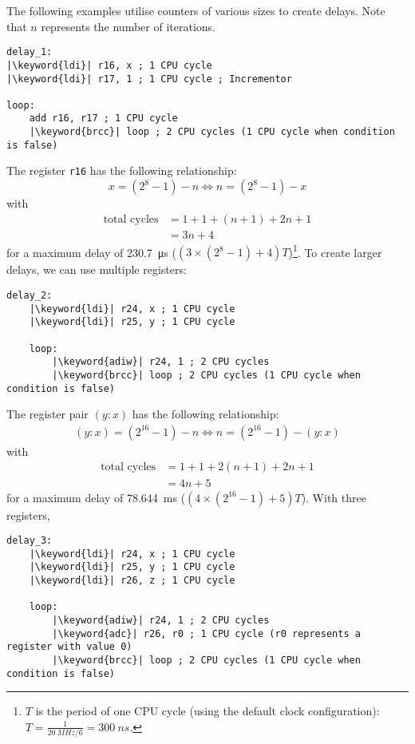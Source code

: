 \documentclass{report}
\newcommand{\keyword}[1]{\textcolor[rgb]{0.00,0.50,0.00}{\textbf{#1}}}
\begin{document}
The following examples utilise counters of various sizes to create
delays. Note that \(n\) represents the number of iterations.
\begin{verbatim}
delay_1:
|\keyword{ldi}| r16, x ; 1 CPU cycle
|\keyword{ldi}| r17, 1 ; 1 CPU cycle ; Incrementor

loop:
    add r16, r17 ; 1 CPU cycle
    |\keyword{brcc}| loop ; 2 CPU cycles (1 CPU cycle when condition is false)
\end{verbatim}
The register \texttt{r16} has the following relationship:
\begin{equation*}
    x = \left( 2^8 - 1 \right) - n \iff n = \left( 2^8 - 1 \right) - x
\end{equation*}
with
\begin{align*}
    \text{total cycles} & = 1 + 1 + \left( n + 1 \right) + 2 n + 1 \\
                        & = 3 n + 4
\end{align*}
for a maximum delay of \qty{230.7}{\micro s} (\(\left( 3 \times \left( 2^8 - 1 \right) + 4 \right) T\))\footnote{\(T\) is the period of one CPU cycle (using the default clock configuration): \(T = \frac{1}{\qty{20}{MHz} / 6} = \qty{300}{ns}\).}.
To create larger delays, we can use multiple registers:
\begin{verbatim}
delay_2:
    |\keyword{ldi}| r24, x ; 1 CPU cycle
    |\keyword{ldi}| r25, y ; 1 CPU cycle

    loop:
        |\keyword{adiw}| r24, 1 ; 2 CPU cycles
        |\keyword{brcc}| loop ; 2 CPU cycles (1 CPU cycle when condition is false)
\end{verbatim}
The register pair \(\left( y:x \right)\) has the following
relationship:
\begin{align*}
    \left( y:x \right) = \left( 2^{16} - 1 \right) - n \iff n = \left( 2^{16} - 1 \right) - \left( y:x \right)
\end{align*}
with
\begin{align*}
    \text{total cycles} & = 1 + 1 + 2 \left( n + 1 \right) + 2 n + 1 \\
                        & = 4n + 5
\end{align*}
for a maximum delay of \qty{78.644}{ms} (\(\left(4 \times \left( 2^{16} - 1 \right) + 5 \right) T\)).
With three registers,
\begin{verbatim}
delay_3:
    |\keyword{ldi}| r24, x ; 1 CPU cycle
    |\keyword{ldi}| r25, y ; 1 CPU cycle
    |\keyword{ldi}| r26, z ; 1 CPU cycle

    loop:
        |\keyword{adiw}| r24, 1 ; 2 CPU cycles
        |\keyword{adc}| r26, r0 ; 1 CPU cycle (r0 represents a register with value 0)
        |\keyword{brcc}| loop ; 2 CPU cycles (1 CPU cycle when condition is false)
\end{verbatim}
\end{document}
